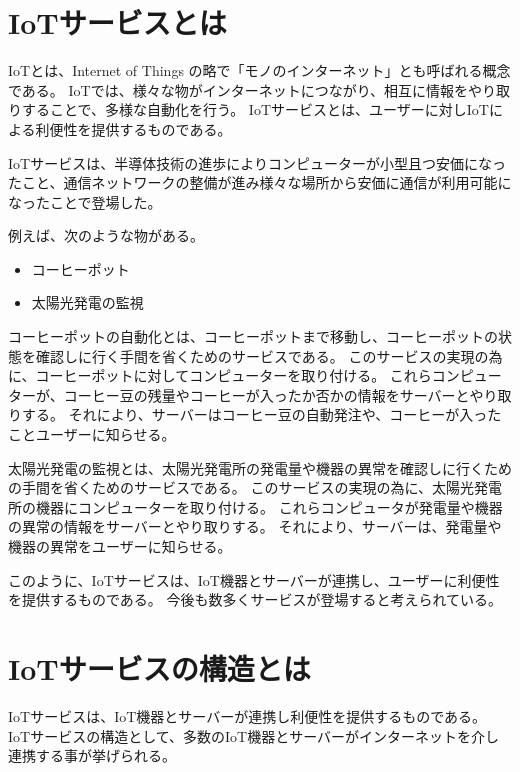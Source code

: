 \section{IoTサービスとは}
IoTとは、Internet of Things の略で「モノのインターネット」とも呼ばれる概念である。
IoTでは、様々な物がインターネットにつながり、相互に情報をやり取りすることで、多様な自動化を行う。
IoTサービスとは、ユーザーに対しIoTによる利便性を提供するものである。
\medskip

IoTサービスは、半導体技術の進歩によりコンピューターが小型且つ安価になったこと、通信ネットワークの整備が進み様々な場所から安価に通信が利用可能になったことで登場した。
\medskip

例えば、次のような物がある。
\begin{itemize}
	\item コーヒーポット
	\item 太陽光発電の監視
\end{itemize}

コーヒーポットの自動化とは、コーヒーポットまで移動し、コーヒーポットの状態を確認しに行く手間を省くためのサービスである。
このサービスの実現の為に、コーヒーポットに対してコンピューターを取り付ける。
これらコンピューターが、コーヒー豆の残量やコーヒーが入ったか否かの情報をサーバーとやり取りする。
それにより、サーバーはコーヒー豆の自動発注や、コーヒーが入ったことユーザーに知らせる。
\medskip

太陽光発電の監視とは、太陽光発電所の発電量や機器の異常を確認しに行くための手間を省くためのサービスである。
このサービスの実現の為に、太陽光発電所の機器にコンピューターを取り付ける。
これらコンピュータが発電量や機器の異常の情報をサーバーとやり取りする。
それにより、サーバーは、発電量や機器の異常をユーザーに知らせる。
\medskip

このように、IoTサービスは、IoT機器とサーバーが連携し、ユーザーに利便性を提供するものである。
今後も数多くサービスが登場すると考えられている。

\section{IoTサービスの構造とは}
IoTサービスは、IoT機器とサーバーが連携し利便性を提供するものである。
IoTサービスの構造として、多数のIoT機器とサーバーがインターネットを介し連携する事が挙げられる。
\medskip

